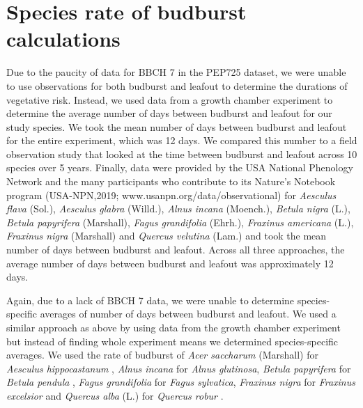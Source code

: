 \documentclass{article}\usepackage[]{graphicx}\usepackage[]{color}
\begin{document}
{\section*{Species rate of budburst calculations}
Due to the paucity of data for BBCH 7 in the PEP725 dataset, we were unable to use observations for both budburst and leafout to determine the durations of vegetative risk. Instead, we used data from a growth chamber experiment \citep{Flynn2018} to determine the average number of days between budburst and leafout for our study species. %
We took the mean number of days between budburst and leafout for the entire experiment, which was 12 days. We compared this number to a field observation study \citep{Donnelly2017} that looked at the time between budburst and leafout across 10 species over 5 years. Finally, data were provided by the USA National Phenology Network and the many participants who contribute to its Nature’s Notebook program (USA-NPN,2019; www.usanpn.org/data/observational) for \textit{Aesculus flava} (Sol.), \textit{Aesculus glabra} (Willd.), \textit{Alnus incana} (Moench.), \textit{Betula nigra} (L.), \textit{Betula papyrifera} (Marshall), \textit{Fagus grandifolia} (Ehrh.), \textit{Fraxinus americana} (L.), \textit{Fraxinus nigra} (Marshall) and \textit{Quercus velutina} (Lam.) and took the mean number of days between budburst and leafout. Across all three approaches, the average number of days between budburst and leafout was approximately 12 days.  

Again, due to a lack of BBCH 7 data, we were unable to determine species-specific averages of number of days between budburst and leafout. We used a similar approach as above by using data from the growth chamber experiment \citep{Flynn2018} but instead of finding whole experiment means we determined species-specific averages. We used the rate of budburst of \textit{Acer saccharum} (Marshall) for \textit{Aesculus hippocastanum} \citep{Buerki2010}, \textit{Alnus incana} for \textit{Alnus glutinosa}, \textit{Betula papyrifera} for \textit{Betula pendula} \citep{Wang2016}, \textit{Fagus grandifolia} for \textit{Fagus sylvatica}, \textit{Fraxinus nigra} for \textit{Fraxinus excelsior} and \textit{Quercus alba} (L.) for \textit{Quercus robur} \citep{Hipp2017}.

}
\end{document}

